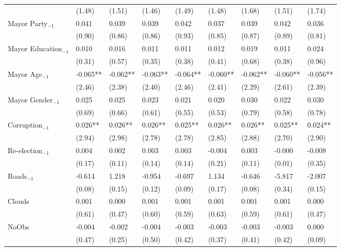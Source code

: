 \begin{table}[htp!]
\begin{tabularx}{\columnwidth}{Z E E E E E E E E }
                        & 		(1.48)	&	(1.51)	&	(1.46)	&	(1.49)	&	(1.48)	&	(1.68)	&	(1.51)	&	(1.74)	\\
    Mayor Party$_{-1}$ & 0.041	&	0.039	&	0.039	&	0.042	&	0.037	&	0.039	&	0.042	&	0.036	\\
                        & 		(0.90)	&	(0.86)	&	(0.86)	&	(0.93)	&	(0.85)	&	(0.87)	&	(0.89)	&	(0.81)	\\
    Mayor Education$_{-1}$ &	0.010	&	0.016	&	0.011	&	0.011	&	0.012	&	0.019	&	0.011	&	0.024	\\
                        & 		(0.31)	&	(0.57)	&	(0.35)	&	(0.38)	&	(0.41)	&	(0.68)	&	(0.38)	&	(0.96)	\\
    Mayor Age$_{-1}$ & -0.065**	&	-0.062**	&	-0.063**	&	-0.064**	&	-0.060**	&	-0.062**	&	-0.060**	&	-0.056**	\\
                        & 		(2.46)	&	(2.38)	&	(2.40)	&	(2.46)	&	(2.41)	&	(2.29)	&	(2.61)	&	(2.39)	\\
    Mayor Gender$_{-1}$ &	0.025	&	0.025	&	0.023	&	0.021	&	0.020	&	0.030	&	0.022	&	0.030	\\
                        & 		(0.69)	&	(0.66)	&	(0.61)	&	(0.55)	&	(0.53)	&	(0.79)	&	(0.58)	&	(0.78)	\\
    Corruption$_{-1}$ & 0.026**	&	0.026**	&	0.026**	&	0.025**	&	0.026**	&	0.026**	&	0.025**	&	0.024**	\\
                        & 		(2.94)	&	(2.98)	&	(2.78)	&	(2.78)	&	(2.85)	&	(2.88)	&	(2.70)	&	(2.90)	\\
    Re-election$_{-1}$ &	0.004	&	0.002	&	0.003	&	0.003	&	-0.004	&	0.003	&	-0.000	&	-0.008	\\
    	                & (0.17)	&	(0.11)	&	(0.14)	&	(0.14)	&	(0.21)	&	(0.11)	&	(0.01)	&	(0.35)	\\
    Roads$_{-1}$ & -0.614	&	1.218	&	-0.954	&	-0.697	&	1.134	&	-0.646	&	-5.817	&	-2.007	\\
                        &  	(0.08)	&	(0.15)	&	(0.12)	&	(0.09)	&	(0.17)	&	(0.08)	&	(0.34)	&	(0.15)	\\              
    Clouds & 0.001	&	0.000	&	0.001	&	0.001	&	0.001	&	0.001	&	0.001	&	0.000	\\
                        & 	(0.61)	&	(0.47)	&	(0.60)	&	(0.59)	&	(0.63)	&	(0.59)	&	(0.61)	&	(0.47)	\\
    NoObs & 	-0.004	&	-0.002	&	-0.004	&	-0.003	&	-0.003	&	-0.003	&	-0.003	&	0.000	\\
                      	& (0.47)	&	(0.25)	&	(0.50)	&	(0.42)	&	(0.37)	&	(0.41)	&	(0.42)	&	(0.09)	\\

\end{tabularx}
\end{table}

